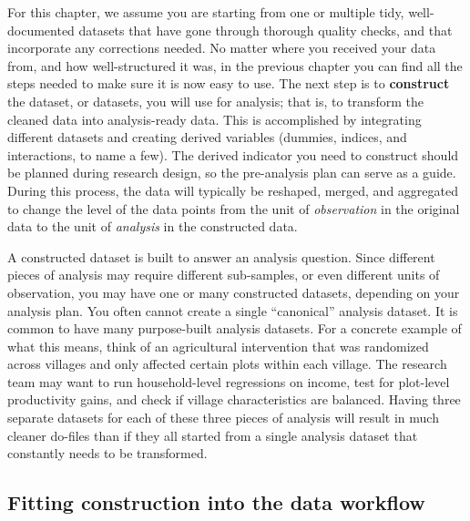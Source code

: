 For this chapter, we assume you are starting from one or multiple tidy,
well-documented datasets that have gone through thorough quality checks,
and that incorporate any corrections needed.
No matter where you received your data from, and how well-structured it was,
in the previous chapter you can find all the steps needed to make sure it is now easy to use.
The next step is to \textbf{construct}
the dataset, or datasets, you will use for analysis;
that is, to transform the cleaned data into analysis-ready data.
This is accomplished by integrating different datasets and creating derived variables 
(dummies, indices, and interactions, to name a few).
The derived indicator you need to construct should be
planned during research design,
so the pre-analysis plan can serve as a guide.
During this process, the data will typically be 
reshaped, merged, and aggregated to change the level of the data points
from the unit of \textit{observation} in the original data 
to the unit of \textit{analysis} in the constructed data.

A constructed dataset is built to answer an analysis question.
Since different pieces of analysis may require different sub-samples,
or even different units of observation,
you may have one or many constructed datasets,
depending on your analysis plan.
You often cannot create a single ``canonical'' analysis dataset.
It is common to have many purpose-built analysis datasets.
For a concrete example of what this means,
think of an agricultural intervention that was randomized across villages
and only affected certain plots within each village.
The research team may want to run household-level regressions on income,
test for plot-level productivity gains,
and check if village characteristics are balanced.
Having three separate datasets for each of these three pieces of analysis
will result in much cleaner do-files than if they all started from 
a single analysis dataset that constantly needs to be transformed.

\subsection{Fitting construction into the data workflow}

